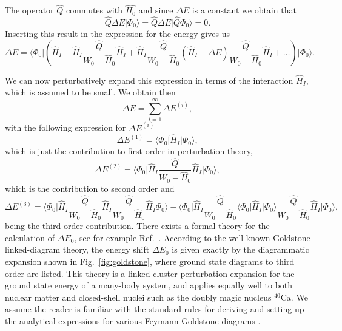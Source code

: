   The operator $\hat{Q}$ commutes with $\hat{H_0}$ and since $\Delta
  E$ is a constant we obtain that
  \[
  \hat{Q}\Delta E\vert \Phi_0\rangle = \hat{Q}\Delta E\vert
  \hat{Q}\Phi_0\rangle = 0.
  \]
  Inserting this result in the expression for the energy gives us
  \[
  \Delta E=\langle \Phi_0\vert
  \left(\hat{H}_I+\hat{H}_I\frac{\hat{Q}}{W_0-\hat{H}_0}\hat{H}_I+
  \hat{H}_I\frac{\hat{Q}}{W_0-\hat{H}_0}(\hat{H}_I-\Delta
  E)\frac{\hat{Q}}{W_0-\hat{H}_0}\hat{H}_I+\dots\right)\vert
  \Phi_0\rangle.
  \]



  We can now perturbatively expand this expression in terms of the interaction
   $\hat{H}_I$, which is assumed to be small. We obtain then
  \[
  \Delta E=\sum_{i=1}^{\infty}\Delta E^{(i)},
  \]
  with the following expression for $\Delta E^{(i)}$
  \[
  \Delta E^{(1)}=\langle \Phi_0\vert \hat{H}_I\vert \Phi_0\rangle,
  \] 
  which is just the contribution to first order in perturbation
  theory,
  \[
  \Delta E^{(2)}=\langle\Phi_0\vert
  \hat{H}_I\frac{\hat{Q}}{W_0-\hat{H}_0}\hat{H}_I\vert \Phi_0\rangle,
  \]
  which is the contribution to second order and
  \[
  \Delta E^{(3)}=\langle \Phi_0\vert
  \hat{H}_I\frac{\hat{Q}}{W_0-\hat{H}_0}\hat{H}_I\frac{\hat{Q}}{W_0-\hat{H}_0}\hat{H}_I\Phi_0\rangle-
  \langle\Phi_0\vert \hat{H}_I\frac{\hat{Q}}{W_0-\hat{H}_0}\langle
  \Phi_0\vert \hat{H}_I\vert
  \Phi_0\rangle\frac{\hat{Q}}{W_0-\hat{H}_0}\hat{H}_I\vert
  \Phi_0\rangle,
  \]
  being the third-order contribution.
  There exists a formal theory for the calculation
  of $\Delta E_0$, see for example Ref.~\cite{shavittbartlett2009}.  According to the well-known Goldstone
  linked-diagram theory, the energy shift $\Delta E_0$ is given
  exactly by the diagrammatic expansion shown in
  Fig.~\ref{fig:goldstone}, where ground state diagrams to third order are listed. This theory is a linked-cluster
  perturbation expansion for the ground state energy of a many-body
  system, and applies equally well to both nuclear matter and
  closed-shell nuclei such as the doubly magic nucleus $^{40}$Ca.  
We assume the reader is familiar 
with the standard rules for deriving and setting up the analytical expressions for various Feymann-Goldstone diagrams \cite{shavittbartlett2009}.
